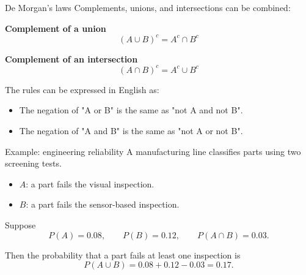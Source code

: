 \documentclass[12pt]{beamer}
\newcommand{\vocab}[1]{\textcolor{AggieMaroon}{\textbf{#1}}}
\begin{document}
\begin{frame}{}
\begin{block}{De Morgan's laws}
Complements, unions, and intersections can be combined:

\vspace{0.2cm}
\vocab{Complement of a union}
\[
(A\cup B)^c = A^c \cap B^c
\]

\vspace{0.2cm}
\vocab{Complement of an intersection}
\[
(A\cap B)^c = A^c \cup B^c
\]
\end{block}

The rules can be expressed in English as:
\begin{itemize}
  \item The negation of "A or B" is the same as "not A and not B".
  \item The negation of "A and B" is the same as "not A or not B".
\end{itemize}
\end{frame}

\begin{frame}{}
\begin{block}{Example: engineering reliability}
A manufacturing line classifies parts using two screening tests.

\begin{itemize}
  \item $A$: a part fails the visual inspection.
  \item $B$: a part fails the sensor-based inspection.
\end{itemize}

Suppose
\[
P(A)=0.08, \qquad P(B)=0.12, \qquad P(A\cap B)=0.03.
\]

\vspace{0.2cm}
Then the probability that a part fails at least one inspection is
\[
P(A\cup B)=0.08+0.12-0.03=0.17.
\]
\end{block}
\end{frame}
\end{document}
